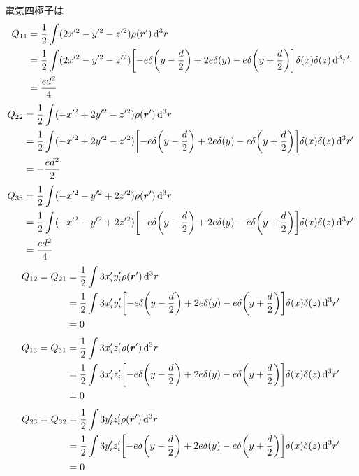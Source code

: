\documentclass[../../sp_2022.tex]{subfiles}
\begin{document}
電気四極子は
\begin{equation}\begin{aligned}[b]
    Q_{11}
    &= \frac{1}{2} \int(2x'^2-y'^2-z'^2)\rho(\vb*{r}')\dd[3]{r}\\
    &= \frac{1}{2} \int(2x'^2-y'^2-z'^2) \qty[-e\delta\qty(y-\frac{d}{2})+2e\delta\qty(y)-e\delta\qty(y+\frac{d}{2})]\delta(x)\delta(z)\dd[3]{r'}\\
    &= \frac{ed^2}{4}
\end{aligned}\end{equation}
\begin{equation}\begin{aligned}[b]
    Q_{22}
    &= \frac{1}{2} \int(-x'^2+2y'^2-z'^2)\rho(\vb*{r}')\dd[3]{r}\\
    &= \frac{1}{2} \int(-x'^2+2y'^2-z'^2) \qty[-e\delta\qty(y-\frac{d}{2})+2e\delta\qty(y)-e\delta\qty(y+\frac{d}{2})]\delta(x)\delta(z)\dd[3]{r'}\\
    &= -\frac{ed^2}{2}
\end{aligned}\end{equation}
\begin{equation}\begin{aligned}[b]
    Q_{33}
    &= \frac{1}{2} \int(-x'^2-y'^2+2z'^2)\rho(\vb*{r}')\dd[3]{r}\\
    &= \frac{1}{2} \int(-x'^2-y'^2+2z'^2) \qty[-e\delta\qty(y-\frac{d}{2})+2e\delta\qty(y)-e\delta\qty(y+\frac{d}{2})]\delta(x)\delta(z)\dd[3]{r'}\\
    &= \frac{ed^2}{4}
\end{aligned}\end{equation}
\begin{equation}\begin{aligned}[b]
    Q_{12} = Q_{21}
    &= \frac{1}{2} \int 3x_i'y_i'\rho(\vb*{r}')\dd[3]{r}\\
    &= \frac{1}{2} \int 3x_i'y_i' \qty[-e\delta\qty(y-\frac{d}{2})+2e\delta\qty(y)-e\delta\qty(y+\frac{d}{2})]\delta(x)\delta(z)\dd[3]{r'}\\
    &= 0
\end{aligned}\end{equation}
\begin{equation}\begin{aligned}[b]
    Q_{13} = Q_{31}
    &= \frac{1}{2} \int 3x_i'z_i'\rho(\vb*{r}')\dd[3]{r}\\
    &= \frac{1}{2} \int 3x_i'z_i' \qty[-e\delta\qty(y-\frac{d}{2})+2e\delta\qty(y)-e\delta\qty(y+\frac{d}{2})]\delta(x)\delta(z)\dd[3]{r'}\\
    &= 0
\end{aligned}\end{equation}
\begin{equation}\begin{aligned}[b]
    Q_{23} = Q_{32}
    &= \frac{1}{2} \int 3y_i'z_i'\rho(\vb*{r}')\dd[3]{r}\\
    &= \frac{1}{2} \int 3y_i'z_i' \qty[-e\delta\qty(y-\frac{d}{2})+2e\delta\qty(y)-e\delta\qty(y+\frac{d}{2})]\delta(x)\delta(z)\dd[3]{r'}\\
    &= 0
\end{aligned}\end{equation}
\end{document}
